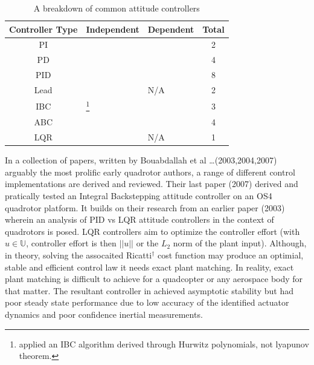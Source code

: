 \begin{table}[h]
\centering
\begin{tabular}{ |c|l|l|c| }
\hline
Controller Type & Independent & Dependent & Total\\ \hline
PI & \cite{attitudecontrolproblem} & \cite{attitudecontrolproblem} & 2\\ \hline
PD & \cite{modelingquadcopter, tiltrihani} & \cite{fullquaternion,singleaxistilting} & 4\\ \hline
PID & \cite{optimizedpidquadcopter, attitudecontrolproblem, quaddynamics, tiltpropellercontrol, pidlqr} & \cite{attitudecontrolproblem, starmac, adaptivedisturbancecontrol} & 8\\ \hline
Lead & \cite{x4flyer, dynamicmodelling2009} & N/A & 2\\ \hline
IBC & \cite{tpheonix, backsteppingquadcoptercontrol}\footnote{\cite{tpheonix} applied an IBC algorithm derived through Hurwitz polynomials, not lyapunov theorem.} & \cite{backsteppingquadcoptercontrol} & 3\\ \hline
ABC & \multicolumn{2}{l|}{\cite{adaptivebackstep, nonlinearadaptive, 6dofbackstep, intelligentbackstep}} & 4\\ \hline
LQR & \cite{pidlqr} & N/A & 1\\ \hline
\end{tabular}
\caption{A breakdown of common attitude controllers}
\label{tab:controllers}
\end{table}
\par
In a collection of papers, written by Bouabdallah et al \ldots (2003,2004,2007) arguably the most prolific early quadrotor authors, a range of different control implementations are derived and reviewed. Their last paper (2007)\cite{fullquadcoptercontrol} derived and pratically tested an Integral Backstepping attitude controller on an OS4 quadrotor platform. It builds on their research from an earlier paper (2003)\cite{pidlqr} wherein an analysis of PID vs LQR attitude controllers in the context of quadrotors is posed. LQR controllers aim to optimize the controller effort (with $u\in\mathbb{U}$, controller effort is then $||u||$ or the $L_2$ norm of the plant input). Although, in theory, solving the assocaited Ricatti$^{\dagger}$ cost function may produce an optimial, stable and efficient control law it needs exact plant matching. In reality, exact plant matching is difficult to achieve for a quadcopter or any aerospace body for that matter. The resultant controller in \cite{pidlqr} achieved asymptotic stability but had poor steady state performance due to low accuracy of the identified actuator dynamics and poor confidence inertial measurements.
